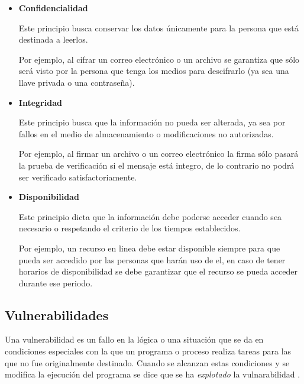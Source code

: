 \begin{itemize}

  \item \textbf{Confidencialidad}

Este principio busca conservar los datos \'{u}nicamente para la persona que est\'{a} destinada a leerlos.

Por ejemplo, al cifrar un correo electr\'{o}nico o un archivo se garantiza que s\'{o}lo ser\'{a} visto por la persona que tenga los medios para descifrarlo (ya sea una llave privada o una contrase\~{n}a).

  \item \textbf{Integridad}

Este principio busca que la informaci\'{o}n no pueda ser alterada, ya sea por fallos en el medio de almacenamiento o modificaciones no autorizadas.

Por ejemplo, al firmar un archivo o un correo electr\'{o}nico la firma s\'{o}lo pasar\'{a} la prueba de verificaci\'{o}n si el mensaje est\'{a} integro, de lo contrario no podr\'{a} ser verificado satisfactoriamente.

  \item \textbf{Disponibilidad}

Este principio dicta que la informaci\'{o}n debe poderse acceder cuando sea necesario o respetando el criterio de los tiempos establecidos.

Por ejemplo, un recurso en linea debe estar disponible siempre para que pueda ser accedido por las personas que har\'{a}n uso de el, en caso de tener horarios de disponibilidad se debe garantizar que el recurso se pueda acceder durante ese periodo.

\end{itemize}

  \subsection {Vulnerabilidades}

Una vulnerabilidad es un fallo en la l\'{o}gica o una situaci\'{o}n que se da en condiciones especiales con la que un programa o proceso realiza tareas para las que no fue originalmente destinado. Cuando se alcanzan estas condiciones y se modifica la ejecuci\'{o}n del programa se dice que se ha \textit{explotado} la vulnarabilidad \cite{padilla_buenas_2009}.


